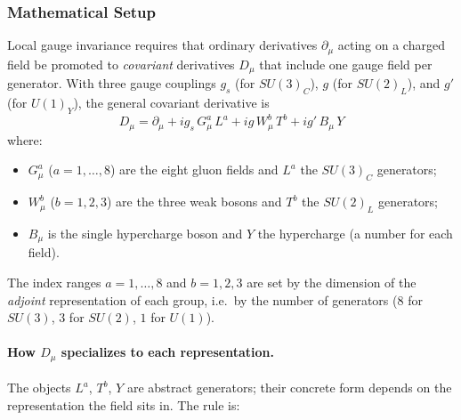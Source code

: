 \subsubsection*{Mathematical Setup}

Local gauge invariance requires that ordinary derivatives
$\partial_\mu$ acting on a charged field be promoted to
\emph{covariant} derivatives $D_\mu$ that include one gauge field per
generator. With three gauge couplings $g_s$ (for $SU(3)_C$), $g$
(for $SU(2)_L$), and $g'$ (for $U(1)_Y$), the general covariant
derivative is
\begin{equation}
  \boxed{
    D_\mu = \partial_\mu
            + i g_s\, G^a_\mu\, L^a
            + i g\, W^b_\mu\, T^b
            + i g'\, B_\mu\, Y
  }
  \label{eq:lec20:covd}
\end{equation}
where:
\begin{itemize}
  \item $G^a_\mu$ ($a=1,\dots,8$) are the eight gluon fields and $L^a$
        the $SU(3)_C$ generators;
  \item $W^b_\mu$ ($b=1,2,3$) are the three weak bosons and $T^b$ the
        $SU(2)_L$ generators;
  \item $B_\mu$ is the single hypercharge boson and $Y$ the hypercharge
        (a number for each field).
\end{itemize}
The index ranges $a=1,\dots,8$ and $b=1,2,3$ are set by the dimension
of the \emph{adjoint} representation of each group, i.e.\ by the number
of generators ($8$ for $SU(3)$, $3$ for $SU(2)$, $1$ for $U(1)$).

\paragraph{How $D_\mu$ specializes to each representation.}
The objects $L^a$, $T^b$, $Y$ are abstract generators; their concrete
form depends on the representation the field sits in. The rule is:

